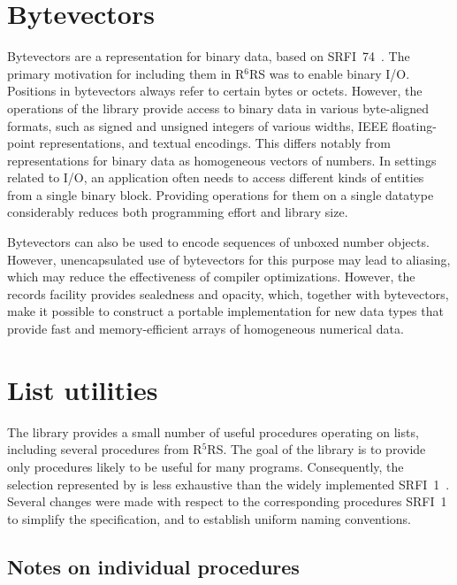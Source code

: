 \documentclass[twoside,twocolumn]{algol60}
\newcommand{\rn}[1]{R$^{#1}$RS}
\begin{document}
\chapter{Bytevectors}

Bytevectors are a representation for binary data, based on
SRFI~74~\cite{srfi74}.  The primary motivation for including them in
\rn{6} was to enable binary I/O.  Positions in bytevectors always
refer to certain bytes or octets.  However, the operations of the
 library provide access to binary data in
various byte-aligned formats, such as signed and unsigned integers of
various widths, IEEE floating-point representations, and textual
encodings.  This differs notably from representations for binary data
as homogeneous vectors of numbers.  In settings related to I/O, an
application often needs to access different kinds of entities from a
single binary block.  Providing operations for them on a single
datatype considerably reduces both programming effort and library
size.

Bytevectors can also be used to encode sequences of unboxed number objects.
However, unencapsulated use of bytevectors for this purpose may lead
to aliasing, which may reduce the effectiveness of compiler
optimizations.  However, the records facility provides sealedness and
opacity, which, together with bytevectors, make it possible to
construct a portable implementation for new data types that
provide fast and memory-efficient arrays of homogeneous numerical
data.

\chapter{List utilities}

The  library provides a small number of useful
procedures operating on lists, including several procedures from
\rn{5}.  The goal of the library is to provide only procedures likely
to be useful for many programs.  Consequently, the selection
represented by  is less exhaustive than the widely
implemented SRFI~1~\cite{srfi1}.  Several changes were made with
respect to the corresponding procedures SRFI~1 to simplify the
specification, and to establish uniform naming conventions.

\section{Notes on individual procedures}
\end{document}
